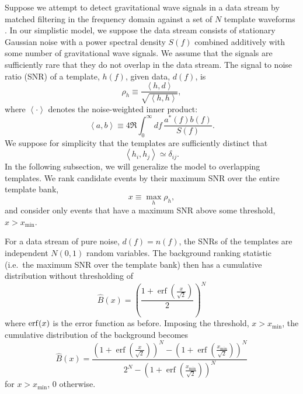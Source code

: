 \documentclass[aps,prd,reprint,nofootinbib]{revtex4-1}
\newcommand{\xmin}{x_\mathrm{min}}
\DeclareMathOperator{\erf}{erf}
\begin{document}
Suppose we attempt to detect gravitational wave signals in a data
stream by matched filtering in the frequency domain against a set of
$N$ template waveforms \citep[e.g.,][]{findchirppaper,LVC2011}.  In
our simplistic model, we suppose the data stream consists of
stationary Gaussian noise with a power spectral density $S(f)$
combined additively with some number of gravitational wave signals.
We assume that the signals are sufficiently rare that they do not
overlap in the data stream.  The signal to noise ratio (SNR) of a
template, $h(f)$, given data, $d(f)$, is
\begin{equation}
  \rho_h \equiv \frac{\left\langle h, d \right\rangle}{\sqrt{\left
      \langle h, h \right\rangle}},
\end{equation}
where $\left \langle \cdot \right\rangle$ denotes the noise-weighted
inner product:
\begin{equation}
  \left\langle a, b \right\rangle \equiv 4 \Re \int_0^\infty df\,
  \frac{a^*(f) b(f)}{S(f)}.
\end{equation}
We suppose for simplicity that the templates are sufficiently distinct
that
\begin{equation}
  \left\langle h_i, h_j \right\rangle \simeq \delta_{ij}.
\end{equation}
In the following subsection, we will generalize the model to
overlapping templates.  We rank candidate events by their maximum SNR
over the entire template bank,
\begin{equation}
  x \equiv \max_{h} \rho_h,
\end{equation}
and consider only events that have a maximum SNR above some threshold,
$x > \xmin$.

For a data stream of pure noise, $d(f) = n(f)$, the SNRs of the
templates are independent $N(0,1)$ random variables.  The background
ranking statistic (i.e.\ the maximum SNR over the template bank) then
has a cumulative distribution without thresholding of
\begin{equation}
  \hat{B}(x) = \left( \frac{1 + \erf\left( \frac{x}{\sqrt{2}}
    \right)}{2} \right)^N
\end{equation}
where ${\rm erf}(x)$ is the error function as before. Imposing the
threshold, $x > \xmin$, the cumulative distribution of the background
becomes
\begin{equation}
  \label{eq:analytic-background-rate}
  \hat{B}(x) = \frac{\left( 1 + \erf\left( \frac{x}{{\sqrt{2}}}
    \right) \right)^N - \left( 1 + \erf\left( \frac{\xmin}{{\sqrt{2}}}
    \right) \right)^N}{2^N - \left( 1 + \erf\left(
    \frac{\xmin}{{\sqrt{2}}} \right) \right)^N }
\end{equation}
for $x>\xmin$, $0$ otherwise.
\end{document}
